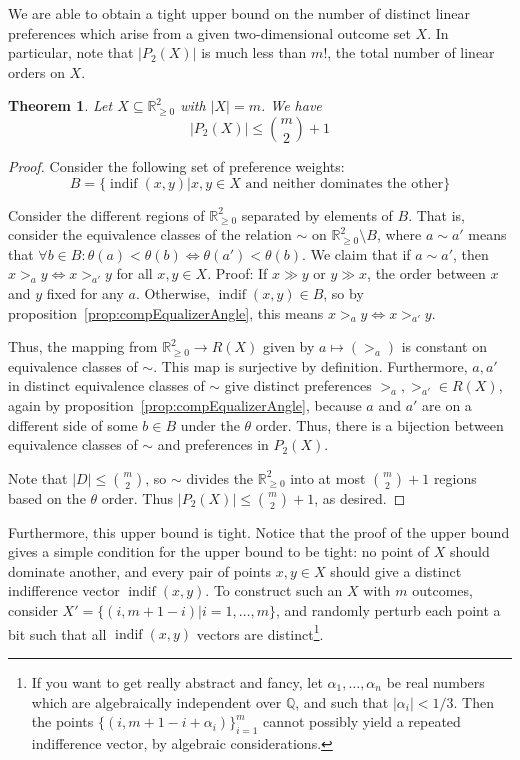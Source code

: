 \documentclass[12pt]{article}
\newtheorem{theorem}{Theorem}
\newcommand{\Rgz}{\mathbb{R}_{\ge 0}}
\newcommand{\sizeof}[1]{\left\lvert{#1}\right\rvert}
\DeclareMathOperator*{\indif}{indif}
\newcommand{\1}[1]{\mathds{1}[{#1}]}
\begin{document}
  We are able to obtain a tight upper bound on the number of distinct linear
  preferences which arise from a given two-dimensional outcome set $X$.
  In particular, note that $|P_2(X)|$ is much less than $m!$, the total number
  of linear orders on $X$.
  \begin{theorem} \label{thrm:maxNumberTwoD}
    Let $X\subseteq \Rgz^2$ with $|X| = m$. We have
    \[ \sizeof{P_2(X)} \leq \binom{m}{2} + 1 \]
  \end{theorem}
  \begin{proof}
    Consider the following set of preference weights:
    \[ B = \{ \indif(x,y) | x,y\in X\text{ and neither dominates the other} \} \]

    Consider the different regions of $\Rgz^2$ separated by elements of $B$.
    That is, consider the equivalence classes of the relation $\sim$
    on $\Rgz^2\setminus B$, where $a \sim a'$
    means that $\forall b\in B: \theta(a) < \theta(b) \iff \theta(a') < \theta(b)$.
    We claim that if $a\sim a'$, then $x >_a y \iff x >_{a'} y$ for all $x,y\in X$.
    Proof: If $x \gg y$ or $y \gg x$, the order between $x$ and $y$ fixed for
    any $a$. Otherwise, $\indif(x,y)\in B$, so
    by proposition~\ref{prop:compEqualizerAngle}, this means
    $x >_a y \iff x >_{a'} y$.

    Thus, the mapping from $\Rgz^2 \to R(X)$ given by $a\mapsto (>_a)$ is constant
    on equivalence classes of $\sim$. This map is surjective by definition.
    Furthermore, $a,a'$ in distinct equivalence classes of $\sim$
    give distinct preferences $>_a, >_{a'}\in R(X)$, again by
    proposition~\ref{prop:compEqualizerAngle}, because $a$ and $a'$ are on a
    different side of some $b\in B$ under the $\theta$ order.
    Thus, there is a bijection between equivalence classes of $\sim$ and
    preferences in $P_2(X)$.

    Note that $|D|\le {m \choose 2}$, so $\sim$ divides the $\Rgz^2$ into at most
    ${m \choose 2}+1$ regions based on the $\theta$ order.
    Thus $\sizeof{P_2(X)} \leq \binom{m}{2} + 1$, as desired.
  \end{proof}

  Furthermore, this upper bound is tight.
  Notice that the proof of the upper bound gives a simple condition for the
  upper bound to be tight: no point of $X$ should dominate another,
  and every pair of points $x,y\in X$ should give a distinct indifference
  vector $\indif(x,y)$.
  To construct such an $X$ with $m$ outcomes, consider
  $X' = \{ (i,m + 1 - i) | i=1,\ldots,m \}$, and randomly perturb each point a
  bit such that all $\indif(x,y)$ vectors are distinct\footnote{
    If you want to get really abstract and fancy, let
    $\alpha_1,\ldots, \alpha_n$ be real numbers which are
    algebraically independent over $\mathbb Q$, and such that
    $|\alpha_i| < 1/3$. Then the points $\{(i,m + 1 - i + \alpha_i)\}_{i=1}^m$
    cannot possibly yield a repeated indifference vector, by
    algebraic considerations.
  }.
\end{document}
